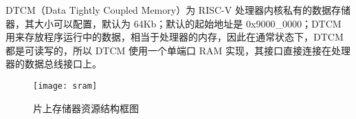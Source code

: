 DTCM（Data Tightly Coupled Memory）为 RISC-V 处理器内核私有的数据存储器，其大小可以配置，默认为 64Kb；默认的起始地址是 0x9000\_0000；DTCM 用来存放程序运行中的数据，相当于处理器的内存，因此在通常状态下，DTCM 都是可读写的，所以 DTCM 使用一个单端口 RAM 实现，其接口直接连接在处理器的数据总线接口上。

\begin{figure}[htbp]
    \centering
    \texttt{[image: sram]}
    \caption{片上存储器资源结构框图}
    \label{fig:sram}
\end{figure}





